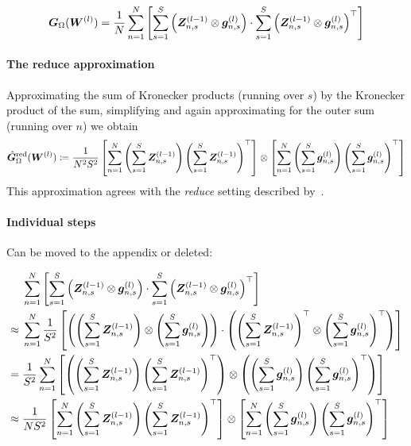\begin{equation*}
    {\bm{G}}_\Omega({\bm{W}}^{(l)})
    =
    \frac1N\sum_{n=1}^N
    \left[\sum_{s=1}^S \left( {\bm{Z}}^{(l-1)}_{n,s}\otimes {\bm{g}}_{n,s}^{(l)} \right)
    \cdot
    \sum_{s=1}^S \left( {\bm{Z}}
    ^{(l-1)}_{n,s}\otimes {\bm{g}}_{n,s}^{(l)} \right)^\top\right]
\end{equation*}

%

\paragraph{The reduce approximation}
Approximating the sum of Kronecker products (running over $s$) by the Kronecker product of the sum, simplifying and again approximating for the outer sum (running over $n$) we obtain
\begin{align*}
    \hat{{\bm{G}}}_\Omega^{\textup{red}}({\bm{W}}^{(l)})
    \coloneqq
    \frac{1}{N^2 S^2} \left[\sum_{n=1}^N \left( \sum_{s=1}^S {\bm{Z}}^{(l-1)}_{n,s} \right) \left(\sum_{s=1}^S {{\bm{Z}}^{(l-1)}_{n,s}}\right)^\top\right]
    \otimes
    \left[\sum_{n=1}^N\left(\sum_{s=1}^S {\bm{g}}^{(l)}_{n,s} \right) \left( \sum_{s=1}^S {{\bm{g}}^{(l)}_{n,s}} \right)^\top \right]
\end{align*}
This approximation agrees with the \emph{reduce} setting described by~\citet{eschenhagen2023kroneckerfactored}.

\paragraph{Individual steps} Can be moved to the appendix or deleted:

\begin{align*}
    &\; \sum_{n=1}^N
    \left[\sum_{s=1}^S \left( {\bm{Z}}^{(l-1)}_{n,s}\otimes {\bm{g}}_{n,s}^{(l)} \right)
    \cdot
    \sum_{s=1}^S \left( {\bm{Z}}
    ^{(l-1)}_{n,s}\otimes {\bm{g}}_{n,s}^{(l)} \right)^\top\right]
    \\ \approx & \;
    \sum_{n=1}^N
    \frac{1}{S^2}\left[\left(\left( \sum_{s=1}^S{\bm{Z}}^{(l-1)}_{n,s}\right)\otimes \left(\sum_{s=1}^S{\bm{g}}_{n,s}^{(l)}\right)\right)
    \cdot
    \left(\left( \sum_{s=1}^S{\bm{Z}}^{(l-1)}_{n,s}\right)^\top\otimes \left(\sum_{s=1}^S{\bm{g}}_{n,s}^{(l)}\right)^\top\right)\right]
    \\ = & \;
    \frac{1}{S^2}\sum_{n=1}^N
    \left[\left(\left( \sum_{s=1}^S{\bm{Z}}^{(l-1)}_{n,s}\right)\left( \sum_{s=1}^S{\bm{Z}}^{(l-1)}_{n,s}\right)^\top \right)\otimes \left(\left(\sum_{s=1}^S{\bm{g}}_{n,s}^{(l)}\right)\left(\sum_{s=1}^S{\bm{g}}_{n,s}^{(l)}\right)^\top\right)
     \right]
    \\ \approx & \;
    \frac{1}{N S^2}\left[\sum_{n=1}^N \left( \sum_{s=1}^S {\bm{Z}}^{(l-1)}_{n,s} \right) \left(\sum_{s=1}^S {{\bm{Z}}^{(l-1)}_{n,s}}\right)^\top\right]
    \otimes
    \left[\sum_{n=1}^N\left(\sum_{s=1}^S {\bm{g}}^{(l)}_{n,s} \right) \left( \sum_{s=1}^S {{\bm{g}}^{(l)}_{n,s}} \right)^\top \right]
\end{align*}


